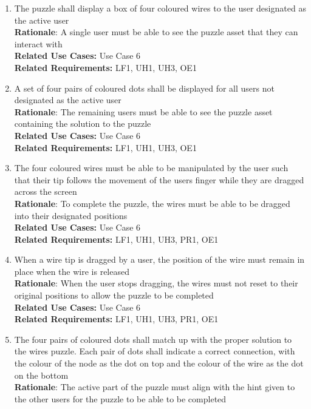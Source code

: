 \documentclass[12pt]{article}
\begin{document}
\begin{enumerate}[label=WP\arabic*., series=WiresPuzzle ]
        \item The puzzle shall display a box of four coloured wires to the user designated as the active user \\
        \textbf{Rationale}: A single user must be able to see the puzzle asset that they can interact with\\
        \textbf{Related Use Cases:} Use Case 6\\
        \textbf{Related Requirements:} LF1, UH1, UH3, OE1
        \item A set of four pairs of coloured dots shall be displayed for all users not designated as the active user \\
        \textbf{Rationale}: The remaining users must be able to see the puzzle asset containing the solution to the puzzle\\
        \textbf{Related Use Cases:} Use Case 6\\
        \textbf{Related Requirements:} LF1, UH1, UH3, OE1
        \item The four coloured wires must be able to be manipulated by the user such that their tip follows the movement of the users finger while they are dragged across the screen \\
        \textbf{Rationale}: To complete the puzzle, the wires must be able to be dragged into their designated positions\\
        \textbf{Related Use Cases:} Use Case 6\\
        \textbf{Related Requirements:} LF1, UH1, UH3, PR1, OE1
        \item When a wire tip is dragged by a user, the position of the wire must remain in place when the wire is released \\
        \textbf{Rationale}: When the user stops dragging, the wires must not reset to their original positions to allow the puzzle to be completed\\
        \textbf{Related Use Cases:} Use Case 6\\
        \textbf{Related Requirements:} LF1, UH1, UH3, PR1, OE1
        \item  The four pairs of coloured dots shall match up with the proper solution to the wires puzzle. Each pair of dots shall indicate a correct connection, with the colour of the node as the dot on top and the colour of the wire as the dot on the bottom\\
        \textbf{Rationale}: The active part of the puzzle must align with the hint given to the other users for the puzzle to be able to be completed \\

\end{enumerate}
\end{document}
